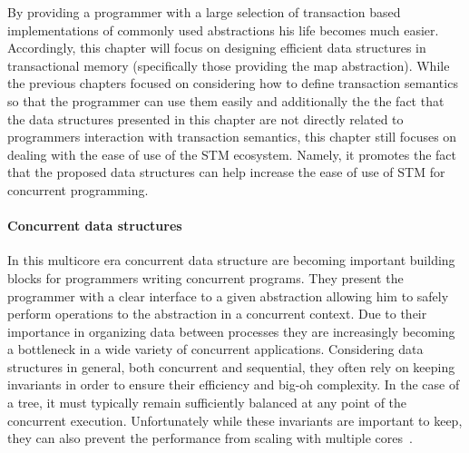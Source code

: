By providing a programmer with a large selection of transaction based implementations of commonly used abstractions
his life becomes much easier.
Accordingly, this chapter will focus on designing efficient data structures in transactional memory (specifically those providing the map abstraction).
While the previous chapters focused on considering how to define transaction semantics so that the programmer can use them easily and additionally
the the fact that the data structures presented in this chapter are not directly related to programmers interaction with transaction semantics,
this chapter still focuses on dealing with the ease of use of the STM ecosystem.
Namely, it promotes the fact that the proposed data structures can help increase the ease of use of STM for concurrent programming.


\paragraph{Concurrent data structures}
In this multicore era concurrent data structure are becoming important building blocks
for programmers writing concurrent programs.
They present the programmer with a clear interface to a given abstraction allowing
him to safely perform operations to the abstraction in a concurrent context.
Due to their importance in organizing data between processes they are increasingly becoming a bottleneck
in a wide variety of concurrent applications.
Considering data structures in general, both concurrent and sequential, they often rely on keeping invariants
in order to ensure their efficiency and big-oh complexity.
In the case of a tree, it must typically remain sufficiently balanced at any point of the concurrent execution.
Unfortunately while these invariants are important to keep, they can also prevent
the performance from scaling with multiple cores~\cite{Sha2011}.


